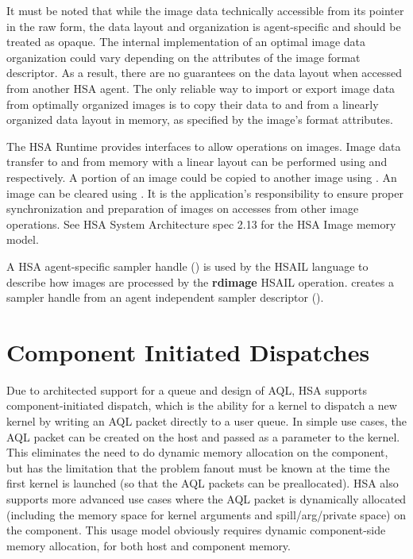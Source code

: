 \documentclass[draft]{book}
\newcommand{\reffun}[1]{\textbf{#1}}
\newcommand{\refhsl}[1]{\reffun{#1}}
\begin{document}
It must be noted that while the image data technically accessible from its
pointer in the raw form, the data layout and organization is agent-specific and
should be treated as opaque. The internal implementation of an optimal image
data organization could vary depending on the attributes of the image format
descriptor. As a result, there are no guarantees on the data layout when
accessed from another HSA agent. The only reliable way to import or export image
data from optimally organized images is to copy their data to and from a
linearly organized data layout in memory, as specified by the image's format
attributes.

The HSA Runtime provides interfaces to allow operations on images. Image data
transfer to and from memory with a linear layout can be performed using
 and  respectively. A
portion of an image could be copied to another image using
. An image can be cleared using
. It is the application's responsibility to ensure
proper synchronization and preparation of images on accesses from other image
operations. See HSA System Architecture spec 2.13 for the HSA Image memory
model.

A HSA agent-specific sampler handle () is used by
the HSAIL language to describe how images are processed by the \refhsl{rdimage}
HSAIL operation.  creates a sampler handle
from an agent independent sampler descriptor
().

\section{Component Initiated Dispatches} \label{architected}
\hypertarget{architectedchptr}{}

Due to architected support for a queue and design of AQL, HSA supports
component-initiated dispatch, which is the ability for a kernel to dispatch a
new kernel by writing an AQL packet directly to a user queue. In simple use
cases, the AQL packet can be created on the host and passed as a parameter to
the kernel. This eliminates the need to do dynamic memory allocation on the
component, but has the limitation that the problem fanout must be known at the
time the first kernel is launched (so that the AQL packets can be
preallocated). HSA also supports more advanced use cases where the AQL packet is
dynamically allocated (including the memory space for kernel arguments and
spill/arg/private space) on the component. This usage model obviously requires
dynamic component-side memory allocation, for both host and component memory.
\end{document}

